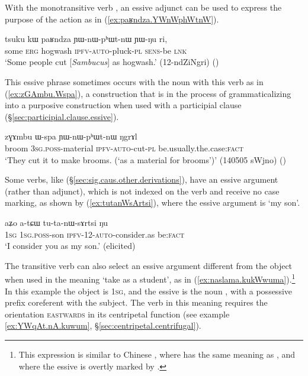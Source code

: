 With the monotransitive verb , an essive adjunct can be used to express the purpose of the action as in (\ref{ex:paʁndza.YWnWphWtnW}).  

\begin{exe}
\ex \label{ex:paʁndza.YWnWphWtnW} 
\gll tsuku kɯ paʁndza ɲɯ-nɯ-pʰɯt-nɯ ɲɯ-ŋu ri,  \\
some \textsc{erg} hogwash \textsc{ipfv}-\textsc{auto}-pluck-\textsc{pl} \textsc{sens}-be \textsc{lnk}   \\
\glt `Some people cut [\textit{Sambucus}] as hogwash.' (12-ndZiNgri)
()
\end{exe}

This essive phrase sometimes occurs with the noun  with this verb as in (\ref{ex:zGAmbu.Wspa}), a construction that is in the process of grammaticalizing into a purposive construction when used with a participial clause (§\ref{sec:participial.clause.essive}).  
 
\begin{exe}
\ex \label{ex:zGAmbu.Wspa}
\gll  zɣɤmbu ɯ-spa ɲɯ-nɯ-pʰɯt-nɯ ŋgrɤl  \\
broom \textsc{3sg}.\textsc{poss}-material \textsc{ipfv}-\textsc{auto}-cut-\textsc{pl} be.usually.the.case:\textsc{fact} \\
\glt `They cut it to make brooms. (`as a material for brooms')' (140505 sWjno) ()
\end{exe}

Some verbs, like  (§\ref{sec:sig.caus.other.derivations}), have an essive argument (rather than adjunct), which is not indexed on the verb and receive no case marking, as shown by  (\ref{ex:tutanWsArtsi}), where the essive argument is  `my son'.

\begin{exe}
\ex \label{ex:tutanWsArtsi}
 \gll aʑo a-tɕɯ tu-ta-nɯ-sɤrtsi ŋu \\
 \textsc{1sg} \textsc{1sg}.\textsc{poss}-son \textsc{ipfv}-1\fl{}2-\textsc{auto}-consider.as be:\textsc{fact} \\
 \glt `I consider you as my son.' (elicited)
\end{exe}


The transitive verb  can also select an essive argument different from the object when used in the meaning `take as a student', as in (\ref{ex:naslama.kukWwuma}).\footnote{This expression is similar to Chinese , where   has the same meaning as , and where the essive is overtly marked by  . } In this example the object is \textsc{1sg}, and the essive is the noun , with a possessive prefix coreferent with the subject. The verb  in this meaning requires the orientation \textsc{eastwards} in its centripetal function (see example \ref{ex:YWqAt.nA.kuwum}, §\ref{sec:centripetal.centrifugal}).

